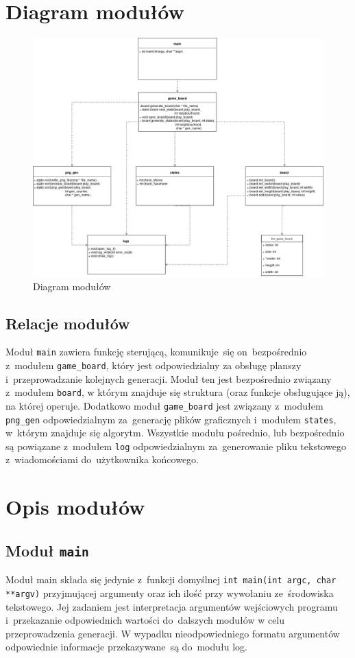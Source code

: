 \documentclass[a4paper,11pt]{article}
\begin{document}
\section{Diagram modułów} 
	\begin{figure}[h]
	  \centering
	  \includegraphics[scale=0.4]{diag.png}
	  \caption{Diagram modułów}
	  \label{fig:}
	\end{figure}
	  \subsection{Relacje modułów}
	  	Moduł \texttt{main} zawiera funkcję sterującą, komunikuje~się on~bezpośrednio z~modułem \texttt{game\_board}, który jest odpowiedzialny za obsługę planszy i~przeprowadzanie kolejnych generacji. Moduł ten jest bezpośrednio związany z~modułem \texttt{board}, w którym znajduje się struktura (oraz funkcje obsługujące ją), na której operuje. Dodatkowo moduł \texttt{game\_board} jest związany z~modułem \texttt{png\_gen} odpowiedzialnym za~generację plików graficznych i~modułem \texttt{states}, w~którym znajduje się algorytm. Wszystkie modułu pośrednio, lub bezpośrednio są powiązane z~modułem \texttt{log} odpowiedzialnym za~generowanie pliku tekstowego z~wiadomościami do~użytkownika końcowego.
	\section{Opis modułów}
		  \subsection{Moduł \texttt{main}}
			Moduł main składa się jedynie z~funkcji domyślnej \texttt{int main(int argc, char **argv)} przyjmującej argumenty oraz ich ilość przy wywołaniu ze~środowiska tekstowego. Jej zadaniem jest interpretacja argumentów wejściowych programu i~przekazanie odpowiednich wartości do~dalszych modułów w celu przeprowadzenia generacji. W wypadku nieodpowiedniego formatu argumentów odpowiednie informacje przekazywane~są do~modułu log.
		 
\end{document}
